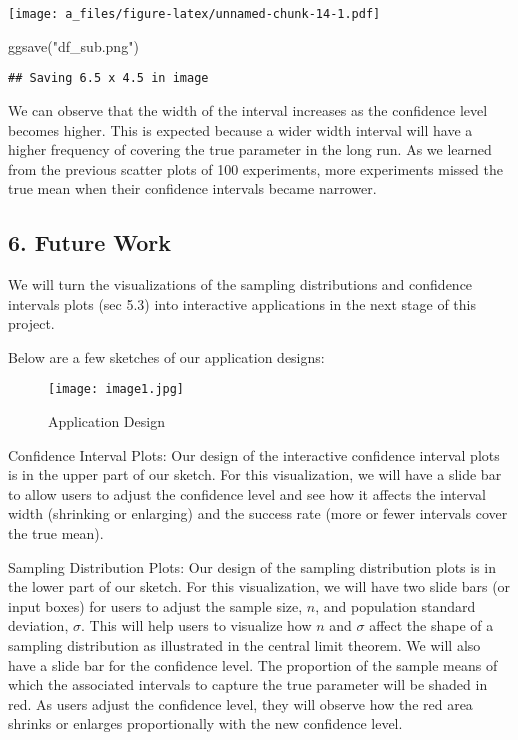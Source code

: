 \documentclass[
]{article}
\newenvironment{Shaded}{\begin{snugshade}}{\end{snugshade}}
\newcommand{\FunctionTok}[1]{\textcolor[rgb]{0.00,0.00,0.00}{#1}}
\newcommand{\NormalTok}[1]{#1}
\newcommand{\StringTok}[1]{\textcolor[rgb]{0.31,0.60,0.02}{#1}}
\begin{document}
\texttt{[image: a\_files/figure-latex/unnamed-chunk-14-1.pdf]}

\begin{Shaded}
\begin{Highlighting}[]
\FunctionTok{ggsave}\NormalTok{(}\StringTok{"df\_sub.png"}\NormalTok{)}
\end{Highlighting}
\end{Shaded}

\begin{verbatim}
## Saving 6.5 x 4.5 in image
\end{verbatim}

We can observe that the width of the interval increases as the
confidence level becomes higher. This is expected because a wider width
interval will have a higher frequency of covering the true parameter in
the long run. As we learned from the previous scatter plots of 100
experiments, more experiments missed the true mean when their confidence
intervals became narrower.

\hypertarget{future-work}{%
\subsection{6. Future Work}\label{future-work}}

We will turn the visualizations of the sampling distributions and
confidence intervals plots (sec 5.3) into interactive applications in
the next stage of this project.

Below are a few sketches of our application designs:

\begin{figure}
\centering
\texttt{[image: image1.jpg]}
\caption{Application Design}
\end{figure}

Confidence Interval Plots: Our design of the interactive confidence
interval plots is in the upper part of our sketch. For this
visualization, we will have a slide bar to allow users to adjust the
confidence level and see how it affects the interval width (shrinking or
enlarging) and the success rate (more or fewer intervals cover the true
mean).

Sampling Distribution Plots: Our design of the sampling distribution
plots is in the lower part of our sketch. For this visualization, we
will have two slide bars (or input boxes) for users to adjust the sample
size, \(n\), and population standard deviation, \(\sigma\). This will
help users to visualize how \(n\) and \(\sigma\) affect the shape of a
sampling distribution as illustrated in the central limit theorem. We
will also have a slide bar for the confidence level. The proportion of
the sample means of which the associated intervals to capture the true
parameter will be shaded in red. As users adjust the confidence level,
they will observe how the red area shrinks or enlarges proportionally
with the new confidence level.
\end{document}
